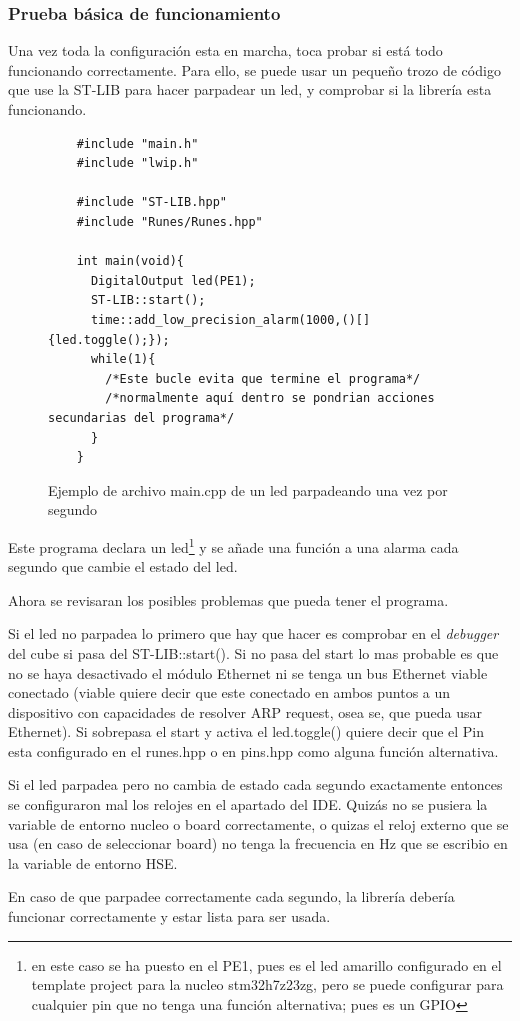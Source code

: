 \documentclass{report}
\begin{document}
\subsubsection{Prueba básica de funcionamiento}
Una vez toda la configuración esta en marcha, toca probar si está todo funcionando correctamente. Para ello, se puede usar un pequeño trozo de código que use la ST-LIB para hacer parpadear un led, y comprobar si la librería esta funcionando. \par 
\begin{figure}[h]
  \begin{lstlisting}
    #include "main.h"
    #include "lwip.h"

    #include "ST-LIB.hpp"
    #include "Runes/Runes.hpp"

    int main(void){
      DigitalOutput led(PE1);
      ST-LIB::start();
      time::add_low_precision_alarm(1000,()[]{led.toggle();});
      while(1){
        /*Este bucle evita que termine el programa*/
        /*normalmente aquí dentro se pondrian acciones secundarias del programa*/
      }
    }
  \end{lstlisting}
\caption{Ejemplo de archivo main.cpp de un led parpadeando una vez por segundo}
\label{BlinkyCode}
\end{figure}
\par \vspace{0.3cm}
Este programa declara un led\footnote{en este caso se ha puesto en el PE1, pues es el led amarillo configurado en el template project para la nucleo stm32h7z23zg, pero se puede configurar para cualquier pin que no tenga una función alternativa; pues es un GPIO} y se añade una función a una alarma cada segundo que cambie el estado del led. \par 
Ahora se revisaran los posibles problemas que pueda tener el programa. 
\par \vspace{0.3cm}
Si el led no parpadea lo primero que hay que hacer es comprobar en el \textit{debugger} del cube si pasa del ST-LIB::start(). Si no pasa del start lo mas probable es que no se haya desactivado el módulo Ethernet ni se tenga un bus Ethernet viable conectado (viable quiere decir que este conectado en ambos puntos a un dispositivo con capacidades de resolver ARP request, osea se, que pueda usar Ethernet). Si sobrepasa el start y activa el led.toggle() quiere decir que el Pin esta configurado en el runes.hpp o en pins.hpp como alguna función alternativa. 
\par \vspace{0.3cm}
Si el led parpadea pero no cambia de estado cada segundo exactamente entonces se configuraron mal los relojes en el apartado del IDE. Quizás no se pusiera la variable de entorno nucleo o board correctamente, o quizas el reloj externo que se usa (en caso de seleccionar board) no tenga la frecuencia en Hz que se escribio en la variable de entorno HSE. 
\par \vspace{0.3cm}
En caso de que parpadee correctamente cada segundo, la librería debería funcionar correctamente y estar lista para ser usada. 
\end{document}

